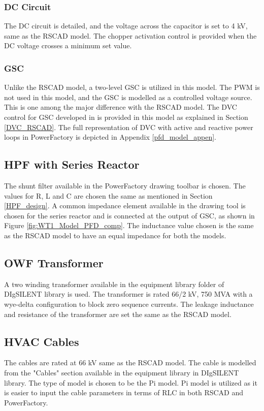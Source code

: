 \subsubsection{DC Circuit}
The DC circuit is detailed, and the voltage across the capacitor is set to 4 kV, same as the RSCAD model. The chopper activation control is provided when the \gls{DC} voltage crosses a minimum set value. 

\subsubsection{GSC}
Unlike the RSCAD model, a two-level \gls{GSC} is utilized in this model. The \gls{PWM} is not used in this model, and the \gls{GSC} is modelled as a controlled voltage source. This is one among the major difference with the RSCAD model. The \gls{DVC} control for \gls{GSC} developed in \cite{korai_dynamic_2019} is provided in this model as explained in Section \ref{DVC_RSCAD}. The full representation of \gls{DVC} with active and reactive power loops in PowerFactory is depicted in Appendix \ref{pfd_model_appen}. 

\subsection{HPF with Series Reactor}
The shunt filter available in the PowerFactory drawing toolbar is chosen. The values for R, L and C are chosen the same as mentioned in Section \ref{HPF_design}. A common impedance element available in the drawing tool is chosen for the series reactor and is connected at the output of \gls{GSC}, as shown in Figure \ref{fig:WT1_Model_PFD_comp}. The inductance value chosen is the same as the RSCAD model to have an equal impedance for both the models.  

\subsection{OWF Transformer}
A two winding transformer available in the equipment library folder of DIgSILENT library is used. The transformer is rated 66/2 kV, 750 MVA with a wye-delta configuration to block zero sequence currents. The leakage inductance and resistance of the transformer are set the same as the RSCAD model.

\subsection{HVAC Cables}
The cables are rated at 66 kV same as the RSCAD model. The cable is modelled from the "Cables" section available in the equipment library in DIgSILENT library. The type of model is chosen to be the Pi model. %
Pi model is utilized as it is easier to input the cable parameters in terms of RLC in both RSCAD and PowerFactory.

